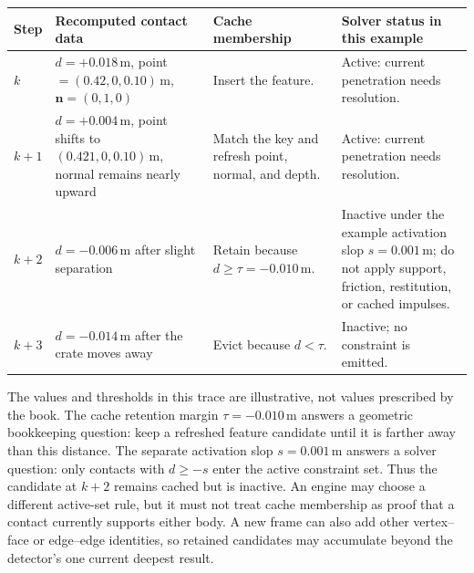 {\def\LTcaptype{none} %
\begin{longtable}[]{@{}
  >{\raggedright\arraybackslash}p{}
  >{\raggedright\arraybackslash}p{}
  >{\raggedright\arraybackslash}p{}
  >{\raggedright\arraybackslash}p{}@{}}
\toprule\noalign{}
\begin{minipage}[b]{\linewidth}\raggedright
Step
\end{minipage} & \begin{minipage}[b]{\linewidth}\raggedright
Recomputed contact data
\end{minipage} & \begin{minipage}[b]{\linewidth}\raggedright
Cache membership
\end{minipage} & \begin{minipage}[b]{\linewidth}\raggedright
Solver status in this example
\end{minipage} \\
\midrule\noalign{}
\endhead
\bottomrule\noalign{}
\endlastfoot
\(k\) & \(d=+0.018\,\mathrm m\), point \(=(0.42,0,0.10)\,\mathrm m\), \(\mathbf n=(0,1,0)\) & Insert the feature. & Active: current penetration needs resolution. \\
\(k+1\) & \(d=+0.004\,\mathrm m\), point shifts to \((0.421,0,0.10)\,\mathrm m\), normal remains nearly upward & Match the key and refresh point, normal, and depth. & Active: current penetration needs resolution. \\
\(k+2\) & \(d=-0.006\,\mathrm m\) after slight separation & Retain because \(d\geq\tau=-0.010\,\mathrm m\). & Inactive under the example activation slop \(s=0.001\,\mathrm m\); do not apply support, friction, restitution, or cached impulses. \\
\(k+3\) & \(d=-0.014\,\mathrm m\) after the crate moves away & Evict because \(d<\tau\). & Inactive; no constraint is emitted. \\
\end{longtable}
}

The values and thresholds in this trace are illustrative, not values prescribed by the book. The cache retention margin \(\tau=-0.010\,\mathrm m\) answers a geometric bookkeeping question: keep a refreshed feature candidate until it is farther away than this distance. The separate activation slop \(s=0.001\,\mathrm m\) answers a solver question: only contacts with \(d\geq-s\) enter the active constraint set. Thus the candidate at \(k+2\) remains cached but is inactive. An engine may choose a different active-set rule, but it must not treat cache membership as proof that a contact currently supports either body. A new frame can also add other vertex--face or edge--edge identities, so retained candidates may accumulate beyond the detector's one current deepest result.

